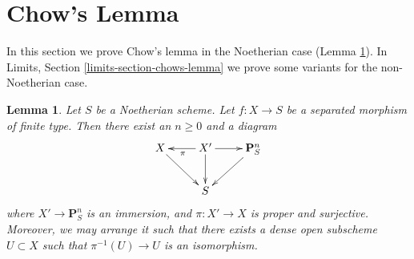 \documentclass{stacks-project}
\newenvironment{reference}{\comment}{\endcomment}
\theoremstyle{plain}
\newtheorem{lemma}[subsection]{Lemma}
\theoremstyle{definition}
\theoremstyle{remark}
\numberwithin{equation}{subsection}
\begin{document}
\section{Chow's Lemma}
\label{section-chows-lemma}

\noindent
In this section we prove Chow's lemma in the Noetherian
case (Lemma \ref{lemma-chow-Noetherian}).
In
Limits, Section \ref{limits-section-chows-lemma}
we prove some variants for the non-Noetherian case.

\begin{lemma}
\label{lemma-chow-Noetherian}
\begin{reference}
\cite[II Theorem 5.6.1(a)]{EGA}
\end{reference}
Let $S$ be a Noetherian scheme.
Let $f : X \to S$ be a separated morphism of finite type.
Then there exist an $n \geq 0$ and a diagram
$$
\xymatrix{
X \ar[rd] & X' \ar[d] \ar[l]^\pi \ar[r] & \mathbf{P}^n_S \ar[dl] \\
& S &
}
$$
where $X' \to \mathbf{P}^n_S$ is an immersion, and
$\pi : X' \to X$ is proper and surjective. Moreover, we may
arrange it such that there exists a dense open subscheme
$U \subset X$ such that $\pi^{-1}(U) \to U$ is an isomorphism.
\end{lemma}
\end{document}
